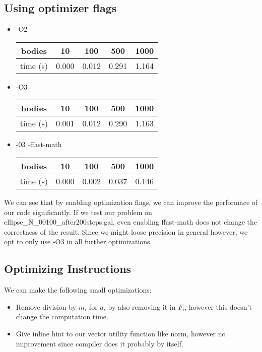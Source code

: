 \documentclass[a4paper]{scrartcl}
\begin{document}
        \subsection{Using optimizer flags}
        \begin{itemize}
            \item -O2
                \noindent\begin{tabular}{c|c|c|c|c}
                    bodies & 10 & 100 & 500 & 1000 \\
                    \hline
                    time (s) & 0.000 & 0.012 & 0.291 & 1.164\\
                \end{tabular}
            \item -O3
                \noindent\begin{tabular}{c|c|c|c|c}\label{tab:baseO3}
                    bodies & 10 & 100 & 500 & 1000 \\
                    \hline
                    time (s) & 0.001 & 0.012 & 0.290 & 1.163\\
                \end{tabular}
            \item -03 -ffast-math
                \noindent\begin{tabular}{c|c|c|c|c}
                    bodies & 10 & 100 & 500 & 1000 \\
                    \hline
                    time (s) & 0.000 & 0.002 & 0.037 & 0.146\\
                \end{tabular}
        \end{itemize}

        We can see that by enabling optimization flags, we can improve the
        performace of our code significantly. If we test our problem on
        ellipse\_N\_00100\_after200steps.gal, even enabling ffast-math does not
        change the correctness of the result. Since we might loose precision in
        general however, we opt to only use -O3 in all further
        optimizations.


        \subsection{Optimizing Instructions}
            We can make the following small optimizations:
            \begin{itemize}
                \item Remove division by $m_i$ for $a_i$ by also removing it in $F_i$, however this doesn't change the computation time.
                \item Give inline hint to our vector utility function like norm, however no improvement since compiler does it probably by itself.
            \end{itemize}
\end{document}
